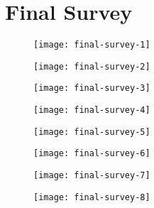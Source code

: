 \chapter{Final Survey} \label{appendix:final-survey}

\begin{figure}[hbt]
  \centering
  \texttt{[image: final-survey-1]}
\end{figure}

\begin{figure}[hbt]
  \centering
  \texttt{[image: final-survey-2]}
\end{figure}

\begin{figure}[hbt]
  \centering
  \texttt{[image: final-survey-3]}
\end{figure}

\begin{figure}[hbt]
  \centering
  \texttt{[image: final-survey-4]}
\end{figure}

\begin{figure}[hbt]
  \centering
  \texttt{[image: final-survey-5]}
\end{figure}

\begin{figure}[hbt]
  \centering
  \texttt{[image: final-survey-6]}
\end{figure}

\begin{figure}[hbt]
  \centering
  \texttt{[image: final-survey-7]}
\end{figure}

\begin{figure}[hbt]
  \centering
  \texttt{[image: final-survey-8]}
\end{figure}